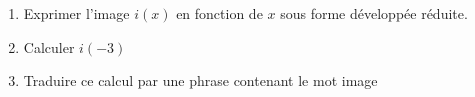 \documentclass[main.tex]{subfiles}
\begin{document}
\begin{example}
\begin{enumerate}
\begin{tikzpicture}[line cap=round,line join=round,>=triangle 45,x=1cm,y=1cm]
		\end{tikzpicture}
		\begin{enumerate}
			\item Exprimer l'image $i(x)$ en fonction de $x$ sous forme développée réduite.
			\item Calculer  $i(-3)$
			\item Traduire ce calcul par une phrase contenant le mot image
		\end{enumerate} 
	\end{enumerate}
\end{example}

%
\newpage  
%	
\end{document}
